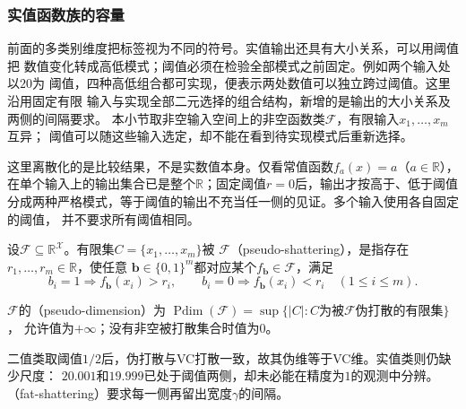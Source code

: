 \subsubsection{实值函数族的容量}
\label{sec:comb-real-valued-threshold-margins}

前面的多类别维度把标签视为不同的符号。实值输出还具有大小关系，可以用阈值把
数值变化转成高低模式；阈值必须在检验全部模式之前固定。例如两个输入处以$20$为
阈值，四种高低组合都可实现，便表示两处数值可以独立跨过阈值。这里沿用固定有限
输入与实现全部二元选择的组合结构，新增的是输出的大小关系及两侧的间隔要求。
本小节取非空输入空间上的非空函数类$\mathcal F$，有限输入$x_1,\ldots,x_m$互异；
阈值可以随这些输入选定，却不能在看到待实现模式后重新选择。

这里离散化的是比较结果，不是实数值本身。仅看常值函数$f_a(x)=a$（$a\in\mathbb R$），
在单个输入上的输出集合已是整个$\mathbb R$；固定阈值$r=0$后，输出才按高于、低于阈值
分成两种严格模式，等于阈值的输出不充当任一侧的见证。多个输入使用各自固定的阈值，
并不要求所有阈值相同。

\begin{definition}[伪打散]
\label{def:pseudo-shattering}
设$\mathcal F\subseteq\mathbb R^{\mathcal X}$。有限集$C=\{x_1,\ldots,x_m\}$被
$\mathcal F$（pseudo-shattering），是指存在$r_1,\ldots,r_m\in\mathbb R$，使任意
$\bm b\in\{0,1\}^m$都对应某个$f_{\bm b}\in\mathcal F$，满足
\[
 b_i=1\Rightarrow f_{\bm b}(x_i)>r_i,\qquad
 b_i=0\Rightarrow f_{\bm b}(x_i)<r_i\quad(1\leq i\leq m).
\]
\end{definition}
\begin{definition}[伪维]
\label{def:pseudo-dimension}
$\mathcal F$的（pseudo-dimension）为
$\operatorname{Pdim}(\mathcal F)=\sup\{|C|:C\text{为被}\mathcal F\text{伪打散的有限集}\}$，
允许值为$+\infty$；没有非空被打散集合时值为$0$。
\end{definition}

二值类取阈值$1/2$后，伪打散与VC打散一致，故其伪维等于VC维。实值类则仍缺少尺度：
$20.001$和$19.999$已处于阈值两侧，却未必能在精度为$1$的观测中分辨。
（fat-shattering）要求每一侧再留出宽度$\gamma$的间隔。

